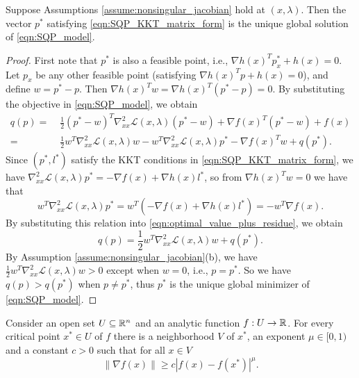 \documentclass[11pt,a4paper]{article}
\begin{document}
\begin{proposition}\label{prop:uniqueness_QP}
Suppose Assumptions \ref{assume:nonsingular_jacobian} hold at $(x,\lambda)$. Then the vector $p^*$ satisfying \eqref{eqn:SQP_KKT_matrix_form} is the unique global solution of \eqref{eqn:SQP_model}.
\end{proposition}

\begin{proof}
First note that $p^*$ is also a feasible point, i.e., $\nabla h(x)^Tp^*_x + h(x) = 0$. Let $p_x$ be any other feasible point (satisfying $\nabla h(x)^Tp + h(x) = 0$), and define $w = p^*-p$. Then $\nabla h(x)^Tw = \nabla h(x)^T(p^*-p) = 0$. By substituting the objective in \eqref{eqn:SQP_model}, we obtain
\begin{align}
q(p) =&\; \frac{1}{2}(p^*-w)^T\nabla_{xx}^2\mathcal{L}(x,\lambda)(p^*-w)+\nabla f(x)^T(p^*-w)+f(x)\nonumber \\
=&\; \frac{1}{2}w^T\nabla_{xx}^2\mathcal{L}(x,\lambda)w - w^T\nabla_{xx}^2\mathcal{L}(x,\lambda)p^* - \nabla f(x)^Tw + q(p^*).\label{eqn:optimal_value_plus_residue}
\end{align}
Since $(p^*,l^*)$ satisfy the KKT conditions in \eqref{eqn:SQP_KKT_matrix_form}, we have $\nabla_{xx}^2\mathcal{L}(x,\lambda)p^* = -\nabla f(x)+\nabla h(x)l^*$, so from $\nabla h(x)^Tw = 0$ we have that
\begin{equation*}
w^T\nabla_{xx}^2\mathcal{L}(x,\lambda)p^* = w^T(-\nabla f(x)+\nabla h(x)l^*) = -w^T\nabla f(x).
\end{equation*}
By substituting this relation into \eqref{eqn:optimal_value_plus_residue}, we obtain
\begin{equation*}
q(p) = \frac{1}{2}w^T\nabla_{xx}^2\mathcal{L}(x,\lambda)w + q(p^*).
\end{equation*}
By Assumption \ref{assume:nonsingular_jacobian}(b), we have $\frac{1}{2}w^T\nabla_{xx}^2\mathcal{L}(x,\lambda)w>0$ except when $w = 0$, i.e., $p = p^*$. So we have $q(p)>q(p^*)$ when $p\neq p^*$, thus $p^*$ is the unique global minimizer of \eqref{eqn:SQP_model}.
\end{proof}

\begin{proposition} \label{prop:Lojasiewicz_inequality}
Consider an open set $U\subseteq \mathbb{R}^n$ and an analytic function $f:U\rightarrow \mathbb{R}$. For every critical point $x^*\in U$ of $f$ there is a neighborhood $V$ of $x^*$, an exponent $\mu\in [0,1)$ and a constant $c>0$ such that for all $x\in V$
\begin{equation*}
\|\nabla f(x)\| \ge c|f(x) - f(x^*)|^\mu.
\end{equation*}
\end{proposition}
\end{document}
